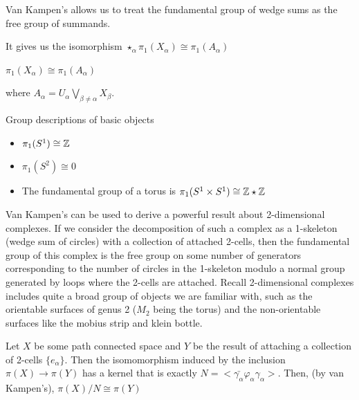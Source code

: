 \documentclass[10pt]{article}
\begin{document}
\begin{note}

Van Kampen's allows us to treat the fundamental group of wedge sums as the free group of summands.

It gives us the isomorphism $\star_{\alpha} \pi_1(X_{\alpha}) \cong \pi_1(A_{\alpha})$

$\pi_1(X_{\alpha}) \cong \pi_1(A_{\alpha})$

where $A_{\alpha} = U_{\alpha} \bigvee_{\beta \neq \alpha} X_{\beta}$.

\end{note}

\begin{note}Group descriptions of basic objects
	\begin{itemize}
		\item{$\pi_1(S^1) \cong \mathbb{Z}$}
		\item{$\pi_1(S^2) \cong 0$}
		\item{The fundamental group of a torus is $\pi_1(S^1 \times S^1) \cong \mathbb{Z} \star \mathbb{Z}$}
	\end{itemize}
\end{note}

Van Kampen's can be used to derive a powerful result about 2-dimensional complexes. If we consider the decomposition of such a complex as a 1-skeleton (wedge sum of circles) with a collection of attached 2-cells, then the fundamental group of this complex is the free group on some number of generators corresponding to the number of circles in the 1-skeleton modulo a normal group generated by loops where the 2-cells are attached. Recall 2-dimensional complexes includes quite a broad group of objects we are familiar with, such as the orientable surfaces of genus 2 ($M_2$ being the torus) and the non-orientable surfaces like the mobius strip and klein bottle.

\begin{theorem}
	Let $X$ be some path connected space and $Y$ be the result of attaching a
	collection of 2-cells $\{e_{\alpha}\}$. Then the isomomorphism induced by the
	inclusion $\pi(X) \to \pi(Y)$ has a kernel that is exactly $N = <
	\bar{\gamma_{\alpha}}\varphi_{\alpha}\gamma_{\alpha} >$. Then, (by van
	Kampen's), $\pi(X) / N \cong \pi(Y)$
\end{theorem}
\end{document}
